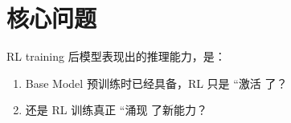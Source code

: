 \section{核心问题}
RL training 后模型表现出的推理能力，是：
\begin{enumerate}
  \item Base Model 预训练时已经具备，RL 只是 ``激活 了？
  \item 还是 RL 训练真正 ``涌现 了新能力？
\end{enumerate}


